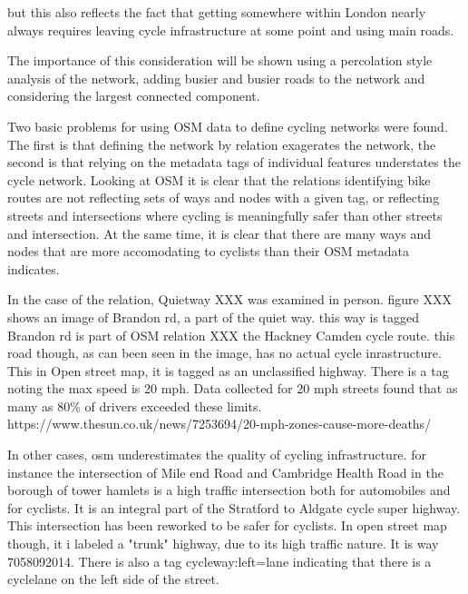 \documentclass[11pt]{article} %
\begin{document}
but this also reflects the fact that getting somewhere within London nearly always requires leaving cycle infrastructure at some point and using main roads. 

The importance of this consideration will be shown using a percolation style analysis of the network, adding busier and busier roads to the network and considering the largest connected component. 



Two basic problems for using OSM data to define cycling networks were found. The first is that defining the network by relation exagerates the network, the second is that relying on the metadata tags of individual features understates the cycle network. Looking at OSM it is clear that the relations identifying bike routes are not reflecting sets of ways and nodes with a given tag, or reflecting streets and intersections where cycling is meaningfully safer than other streets and intersection. At the same time, it is clear that there are many ways and nodes that are more accomodating to cyclists than their OSM metadata indicates. 

In the case of the relation, Quietway XXX was examined in person. figure XXX shows an image of Brandon rd, a part of the quiet way. this way is tagged
Brandon rd is part of OSM relation XXX the Hackney Camden cycle route.  this road though, as can been seen in the image, has no actual cycle inrastructure. This in Open street map, it is tagged as an unclassified highway. There is a tag noting the max speed is 20 mph. Data collected for 20 mph streets found that as many as 80\% of drivers exceeded these limits. 
https://www.thesun.co.uk/news/7253694/20-mph-zones-cause-more-deaths/

In other cases, osm underestimates the quality of cycling infrastructure. for instance the intersection of Mile end Road and Cambridge Health Road in the borough of tower hamlets is a high traffic intersection both for automobiles and for cyclists. It is an integral part of the Stratford to Aldgate cycle super highway. This intersection has been reworked to be safer for cyclists. In open street map though, it i labeled a "trunk" highway, due to its high traffic nature. It is way 7058092014. There is also a tag cycleway:left=lane indicating that there is a cyclelane on the left side of the street. 
\end{document}

